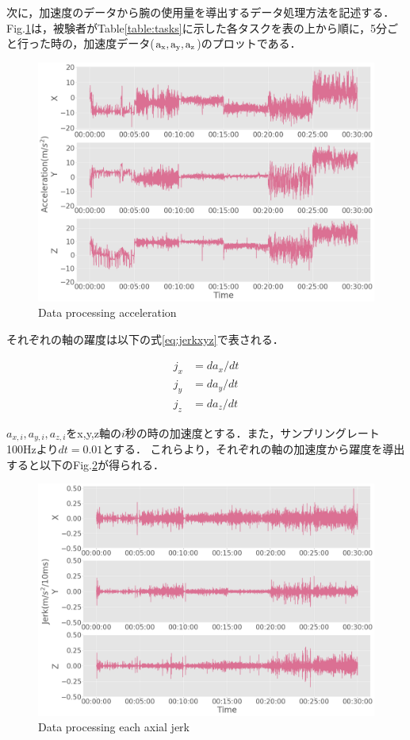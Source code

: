 次に，加速度のデータから腕の使用量を導出するデータ処理方法を記述する．
Fig.\ref{fig:accel_xyz}は，被験者がTable\ref{table:tasks}に示した各タスクを表の上から順に，5分ごと行った時の，加速度データ($\rm{a_x, a_y, a_z}$)のプロットである．

\begin{figure}[H]
  \centering
  \includegraphics[width=0.8\linewidth]{fig/accel_xyz}
  \caption{Data processing acceleration}
  \label{fig:accel_xyz}
\end{figure}


それぞれの軸の躍度は以下の式\ref{eq:jerkxyz}で表される．

\begin{eqnarray}
j_x & = da_x/dt\\
j_y & = da_y/dt\\
j_z & = da_z/dt
\label{eq:jerkxyz}
\end{eqnarray}

$a_{x,i}, a_{y,i},a_{z,i}$をx,y,z軸の$i$秒の時の加速度とする．また，サンプリングレート100Hzより$dt=0.01$とする．
これらより，それぞれの軸の加速度から躍度を導出すると以下のFig.\ref{fig:jerk_xyz}が得られる．

\begin{figure}[H]
  \centering
  \includegraphics[width=0.8\linewidth]{fig/jerk_xyz}
  \caption{Data processing each axial jerk}
  \label{fig:jerk_xyz}
\end{figure}

